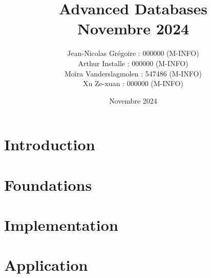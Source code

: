 \documentclass[journal, a4paper]{IEEEtran}
\begin{document}
\title{Advanced Databases \\\vspace*{20pt} \normalsize Novembre 2024}
\author{Jean-Nicolas Grégoire : 000000 (M-INFO) \\
        Arthur Installe : 000000 (M-INFO) \\
        Moïra Vanderslagmolen : 547486 (M-INFO) \\
        Xu Ze-xuan : 000000 (M-INFO)
        }
\date{Novembre 2024}
\maketitle


\section{Introduction}



\section{Foundations}

\section{Implementation}

\section{Application}
\end{document}
